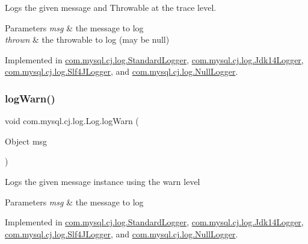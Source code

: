 Logs the given message and Throwable at the \textquotesingle{}trace\textquotesingle{} level.


\begin{DoxyParams}{Parameters}
{\em msg} & the message to log \\
\hline
{\em thrown} & the throwable to log (may be null) \\
\hline
\end{DoxyParams}


Implemented in \mbox{\hyperlink{classcom_1_1mysql_1_1cj_1_1log_1_1_standard_logger_ae77a38e81b2d0ecb1ccbeafee9294bd3}{com.\+mysql.\+cj.\+log.\+Standard\+Logger}}, \mbox{\hyperlink{classcom_1_1mysql_1_1cj_1_1log_1_1_jdk14_logger_a294191637fa5aadb2991b412b1fadde8}{com.\+mysql.\+cj.\+log.\+Jdk14\+Logger}}, \mbox{\hyperlink{classcom_1_1mysql_1_1cj_1_1log_1_1_slf4_j_logger_aa93d48c2e1172db2949b2ac64e58052a}{com.\+mysql.\+cj.\+log.\+Slf4\+J\+Logger}}, and \mbox{\hyperlink{classcom_1_1mysql_1_1cj_1_1log_1_1_null_logger_a49552fc2c395b97c7916eb698ddd3315}{com.\+mysql.\+cj.\+log.\+Null\+Logger}}.

\mbox{\label{interfacecom_1_1mysql_1_1cj_1_1log_1_1_log_a3a30dcfb7f5790b79e9db64431107cfc}} 
\subsubsection{\texorpdfstring{log\+Warn()}{logWarn()}\hspace{0.1cm}{\footnotesize\ttfamily [1/2]}}
{\footnotesize\ttfamily void com.\+mysql.\+cj.\+log.\+Log.\+log\+Warn (\begin{DoxyParamCaption}\item[{Object}]{msg }\end{DoxyParamCaption})}

Logs the given message instance using the \textquotesingle{}warn\textquotesingle{} level


\begin{DoxyParams}{Parameters}
{\em msg} & the message to log \\
\hline
\end{DoxyParams}


Implemented in \mbox{\hyperlink{classcom_1_1mysql_1_1cj_1_1log_1_1_standard_logger_a5197952ca4b6dfe59a54c1aa095717f7}{com.\+mysql.\+cj.\+log.\+Standard\+Logger}}, \mbox{\hyperlink{classcom_1_1mysql_1_1cj_1_1log_1_1_jdk14_logger_ae7bb8949ce0f06e610b7c2f285432ffd}{com.\+mysql.\+cj.\+log.\+Jdk14\+Logger}}, \mbox{\hyperlink{classcom_1_1mysql_1_1cj_1_1log_1_1_slf4_j_logger_a9b6bd04f7179ae6e572fb9ac91ade49e}{com.\+mysql.\+cj.\+log.\+Slf4\+J\+Logger}}, and \mbox{\hyperlink{classcom_1_1mysql_1_1cj_1_1log_1_1_null_logger_aa9e190bc8cca0fb1c78bbc3e9d05cb26}{com.\+mysql.\+cj.\+log.\+Null\+Logger}}.

